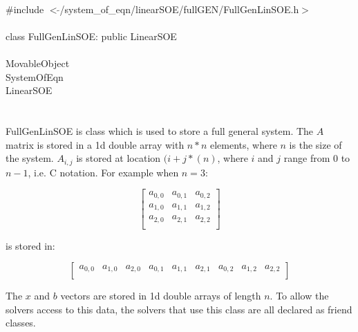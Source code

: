 
   \\
\indent \#include $<\tilde{ }$/system\_of\_eqn/linearSOE/fullGEN/FullGenLinSOE.h$>$  \\

  \\
\indent class FullGenLinSOE: public LinearSOE \\

 \\
\indent MovableObject \\
\indent\indent SystemOfEqn \\
\indent\indent\indent LinearSOE \\
\indent\indent\indent{} \\

  \\
\indent FullGenLinSOE is class which is used to store a full general
system. The $A$ matrix is stored in a 1d double array with $n*n$
elements, where $n$ is the size of the system. $A_{i,j}$ is stored at
location $(i + j*(n)$, where $i$ and $j$ range from $0$ to $n-1$,
i.e. C notation. For example when $n=3$: 

$$
\left[
\begin{array}{ccc}
a_{0,0} & a_{0,1}  & a_{0,2}  \\
a_{1,0} & a_{1,1} & a_{1,2}  \\
a_{2,0} & a_{2,1} & a_{2,2} \\
\end{array}
\right] 
$$

is stored in:

$$
\left[
\begin{array}{cccccccccccccccccccc}
a_{0,0} & a_{1,0}  & a_{2,0} & a_{0,1} & a_{1,1} & a_{2,1} &
a_{0,2} & a_{1,2} & a_{2,2}  \\
\end{array}
\right] 
$$

The $x$ and $b$ vectors are stored in 1d double arrays of length
$n$. To allow the solvers access to this data, the solvers that use
this class are all declared as friend classes. \\


